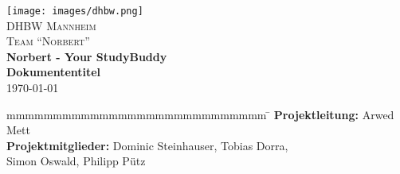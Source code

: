 
\begin{titlepage}
	\begin{center}
        \texttt{[image: images/dhbw.png]}~\\[3cm]
        \textsc{\LARGE DHBW Mannheim}\\[1.5em]
        \textsc{\LARGE Team \enquote{Norbert}}\\[1.5em]
        { \huge \bfseries Norbert - Your StudyBuddy \\[0.5cm] }
        { \LARGE \bfseries Dokumententitel \\[0.4cm] }
        \today
	\end{center}
	\vfill
	\begin{spacing}{1.2}
	\begin{tabbing}
		mmmmmmmmmmmmmmmmmmmmmmmmmmmm \= \kill
        \textbf{Projektleitung:}        \> Arwed Mett\\
        \textbf{Projektmitglieder:}       \> Dominic Steinhauser, Tobias Dorra,\\
     								   \> Simon Oswald, Philipp Pütz\\
	\end{tabbing}
	\end{spacing}
\end{titlepage}
